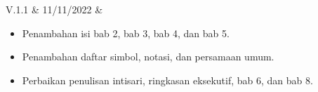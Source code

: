 {V.1.1}					&	%
{11/11/2022}			&	%
{\noindent					%
\begin{itemize}
	\item Penambahan isi bab 2, bab 3, bab 4, dan bab 5.
	\item Penambahan daftar simbol, notasi, dan persamaan umum.
	\item Perbaikan penulisan intisari, ringkasan eksekutif, bab 6, dan bab 8.
\end{itemize}
}